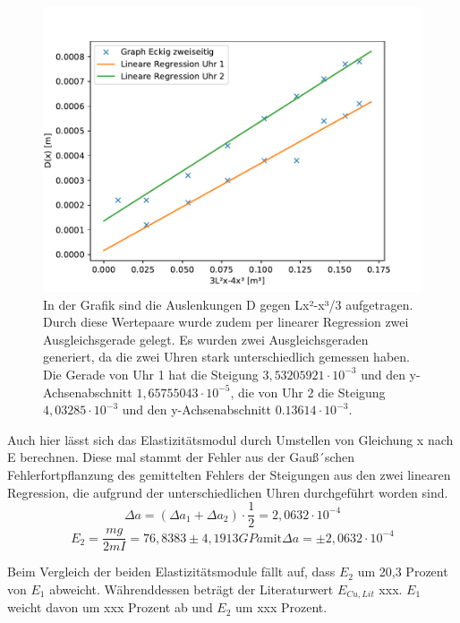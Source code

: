 \documentclass[titlepage = firstcover]{scrartcl}
\begin{document}
        \begin{figure}[h]
          \centering
          \includegraphics[width=0.7\linewidth]{ezwei.pdf}
          \caption{In der Grafik sind die Auslenkungen D gegen Lx²-x³/3 aufgetragen. Durch diese Wertepaare wurde zudem per linearer Regression zwei Ausgleichsgerade gelegt. Es wurden zwei Ausgleichsgeraden generiert, da die zwei Uhren stark unterschiedlich gemessen haben. Die Gerade von Uhr 1 hat die Steigung $3,53205921\cdot10^{-3}$ und den y-Achsenabschnitt $1,65755043\cdot10^{-5}$, die von Uhr 2 die Steigung $4,03285\cdot10^{-3}$ und den y-Achsenabschnitt $0.13614\cdot10^{-3}$.}
          \label{fig:graphEzwei}
        \end{figure}

        Auch hier lässt sich das Elastizitätsmodul durch Umstellen von Gleichung x nach E berechnen. Diese mal stammt der Fehler aus der Gauß´schen 
        Fehlerfortpflanzung des gemittelten Fehlers der Steigungen aus den zwei linearen Regression, die aufgrund der unterschiedlichen Uhren durchgeführt 
        worden sind. 
        \begin{equation*}
          \Delta a = (\Delta a_1 + \Delta a_2) \cdot \frac{1}{2} = 2,0632 \cdot 10^{-4}
        \end{equation*}
        \begin{equation*}
          E_2 = \frac{mg}{2mI} = 76,8383 \pm 4,1913 GPa \text{mit} \Delta a = \pm 2,0632 \cdot 10^{-4}
        \end{equation*}

        Beim Vergleich der beiden Elastizitätsmodule fällt auf, dass $E_2$ um 20,3 Prozent von $E_1$ abweicht. 
        Währenddessen beträgt der Literaturwert $E_{Cu,Lit}$ xxx. $E_1$ weicht davon um xxx Prozent ab und $E_2$ um xxx Prozent.

      \newpage
\end{document}
